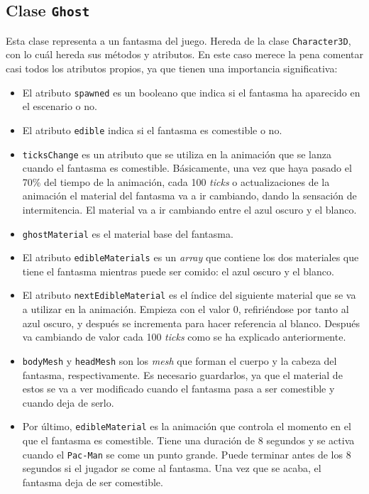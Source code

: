 \documentclass[11pt,a4paper]{article}
\begin{document}
\subsection{Clase \texttt{Ghost}}

Esta clase representa a un fantasma del juego. Hereda de la clase \texttt{Character3D},
con lo cuál hereda sus métodos y atributos. En este caso merece la pena comentar casi todos
los atributos propios, ya que tienen una importancia significativa:

\begin{itemize}
	\item El atributo \texttt{spawned} es un booleano que indica si el fantasma ha aparecido en
	el escenario o no.
	\item El atributo \texttt{edible} indica si el fantasma es comestible o no.
	\item \texttt{ticksChange} es un atributo que se utiliza en la animación que se
	lanza cuando el fantasma es comestible. Básicamente, una vez que haya pasado el 70\%
	del tiempo de la animación, cada 100 \textit{ticks} o actualizaciones de la animación
	el material del fantasma va a ir cambiando, dando la sensación de intermitencia. El material
	va a ir cambiando entre el azul oscuro y el blanco.
	\item \texttt{ghostMaterial} es el material base del fantasma.
	\item El atributo \texttt{edibleMaterials} es un \textit{array} que contiene los 
	dos materiales que tiene el fantasma mientras puede ser comido: el azul oscuro y el blanco.
	\item El atributo \texttt{nextEdibleMaterial} es el índice del siguiente material que se
	va a utilizar en la animación. Empieza con el valor 0, refiriéndose por tanto al azul
	oscuro, y después se incrementa para hacer referencia al blanco. Después va cambiando de
	valor cada 100 \textit{ticks} como se ha explicado anteriormente.
	\item \texttt{bodyMesh} y \texttt{headMesh} son los \textit{mesh} que forman el cuerpo
	y la cabeza del fantasma, respectivamente. Es necesario guardarlos, ya que el material
	de estos se va a ver modificado cuando el fantasma pasa a ser comestible y cuando deja
	de serlo.
	\item Por último, \texttt{edibleMaterial} es la animación que controla el momento en el
	que el fantasma es comestible. Tiene una duración de 8 segundos y se activa cuando el
	\texttt{Pac-Man} se come un punto grande. Puede terminar antes de los 8 segundos si el
	jugador se come al fantasma. Una vez que se acaba, el fantasma deja de ser comestible.
\end{itemize}
\end{document}
